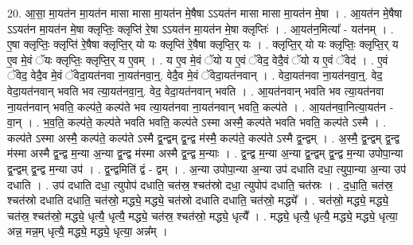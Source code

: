 \documentclass[17pt]{extarticle}
\begin{document}
20. आ॒सा॒ मा॒यत॑न मा॒यत॑न मासा मासा मा॒यत॑न मे॒षैषा ऽऽयत॑न मासा मासा मा॒यत॑न मे॒षा । . आ॒यत॑न मे॒षैषा ऽऽयत॑न मा॒यत॑न मे॒षा क्लृप्तिः॒ क्लृप्ति॑ रे॒षा ऽऽयत॑न मा॒यत॑न मे॒षा क्लृप्तिः॑ । . आ॒यत॑न॒मित्या᳚ - यत॑नम् । . ए॒षा क्लृप्तिः॒ क्लृप्ति॑ रे॒षैषा क्लृप्ति॒र् यो यः क्लृप्ति॑ रे॒षैषा क्लृप्ति॒र् यः । . क्लृप्ति॒र् यो यः क्लृप्तिः॒ क्लृप्ति॒र् य ए॒व मे॒वं ॅयः क्लृप्तिः॒ क्लृप्ति॒र् य ए॒वम् । . य ए॒व मे॒वं ॅयो य ए॒वं ॅवेद॒ वेदै॒वं ॅयो य ए॒वं ॅवेद॑ । . ए॒वं ॅवेद॒ वेदै॒व मे॒वं ॅवेदा॒यत॑नवा ना॒यत॑नवा॒न्॒. वेदै॒व मे॒वं ॅवेदा॒यत॑नवान् । . वेदा॒यत॑नवा ना॒यत॑नवा॒न्॒. वेद॒ वेदा॒यत॑नवान् भवति भव त्या॒यत॑नवा॒न्॒. वेद॒ वेदा॒यत॑नवान् भवति । . आ॒यत॑नवान् भवति भव त्या॒यत॑नवा ना॒यत॑नवान् भवति॒ कल्प॑ते॒ कल्प॑ते भव त्या॒यत॑नवा ना॒यत॑नवान् भवति॒ कल्प॑ते । . आ॒यत॑नवा॒नित्या॒यत॑न - वा॒न् । . भ॒व॒ति॒ कल्प॑ते॒ कल्प॑ते भवति भवति॒ कल्प॑ते ऽस्मा अस्मै॒ कल्प॑ते भवति भवति॒ कल्प॑ते ऽस्मै । . कल्प॑ते ऽस्मा अस्मै॒ कल्प॑ते॒ कल्प॑ते ऽस्मै द्व॒न्द्वम् द्व॒न्द्व म॑स्मै॒ कल्प॑ते॒ कल्प॑ते ऽस्मै द्व॒न्द्वम् । . अ॒स्मै॒ द्व॒न्द्वम् द्व॒न्द्व म॑स्मा अस्मै द्व॒न्द्व म॒न्या अ॒न्या द्व॒न्द्व म॑स्मा अस्मै द्व॒न्द्व म॒न्याः । . द्व॒न्द्व म॒न्या अ॒न्या द्व॒न्द्वम् द्व॒न्द्व म॒न्या उपोपा॒न्या द्व॒न्द्वम् द्व॒न्द्व म॒न्या उप॑ । . द्व॒न्द्वमिति॑ द्वं - द्वम् । . अ॒न्या उपोपा॒न्या अ॒न्या उप॑ दधाति दधा॒ त्युपा॒न्या अ॒न्या उप॑ दधाति । . उप॑ दधाति दधा॒ त्युपोप॑ दधाति॒ चत॑स्र॒ श्चत॑स्रो दधा॒ त्युपोप॑ दधाति॒ चत॑स्रः । . द॒धा॒ति॒ चत॑स्र॒ श्चत॑स्रो दधाति दधाति॒ चत॑स्रो॒ मद्ध्ये॒ मद्ध्ये॒ चत॑स्रो दधाति दधाति॒ चत॑स्रो॒ मद्ध्ये᳚ । . चत॑स्रो॒ मद्ध्ये॒ मद्ध्ये॒ चत॑स्र॒ श्चत॑स्रो॒ मद्ध्ये॒ धृत्यै॒ धृत्यै॒ मद्ध्ये॒ चत॑स्र॒ श्चत॑स्रो॒ मद्ध्ये॒ धृत्यै᳚ । . मद्ध्ये॒ धृत्यै॒ धृत्यै॒ मद्ध्ये॒ मद्ध्ये॒ धृत्या॒ अन्न॒ मन्न॒म् धृत्यै॒ मद्ध्ये॒ मद्ध्ये॒ धृत्या॒ अन्न᳚म् । \newline
\end{document}

